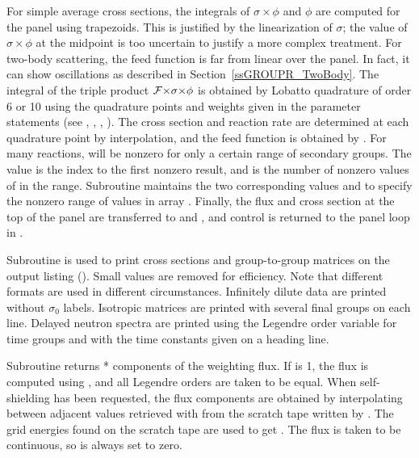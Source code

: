 For simple average cross sections, the integrals of $\sigma{\times}\phi$ and
$\phi$ are computed for the panel using trapezoids.  This is justified by
the linearization of $\sigma$; the value of $\sigma{\times}\phi$ at the
midpoint is too uncertain to justify a more complex treatment.  For
two-body scattering, the feed function is far from linear over the panel.
In fact, it can show oscillations as described in
Section~\ref{ssGROUPR_TwoBody}.  The
integral of the triple product ${\cal F}{\times}\sigma{\times}\phi$ is
obtained by Lobatto quadrature of order 6 or 10
using the quadrature points and weights given in the parameter statements
(see , , , ).  The
cross section and reaction rate are determined at each quadrature point
by interpolation, and the feed function is obtained by .
For many reactions,  will be nonzero for only a certain range
of secondary groups.  The value  is the index to the first
nonzero result, and  is the number of nonzero values of
 in the range.  Subroutine  maintains the two
corresponding values  and  to specify the
nonzero range of values in array .  Finally, the flux
and cross section at the top of the panel are transferred to
 and , and control is returned
to the panel loop in .

Subroutine  is used to
print cross sections and group-to-group matrices on the output
listing ().  Small values are removed for efficiency.
Note that different formats are used in different
circumstances.  Infinitely dilute data are printed without $\sigma_0$
labels.  Isotropic matrices are printed with several final groups on each
line.  Delayed neutron spectra are printed using the Legendre order
variable for time groups and with the time constants given on a heading line.

Subroutine  returns
* components of the weighting flux.  If
 is 1, the flux is computed using
, and all Legendre orders
are taken to be equal.  When self-shielding has been requested, the
flux components are obtained by interpolating between adjacent values
retrieved with  from the scratch tape written by
.  The grid energies found on the scratch tape are used
to get .  The flux is taken to be
continuous, so  is always set to zero.

